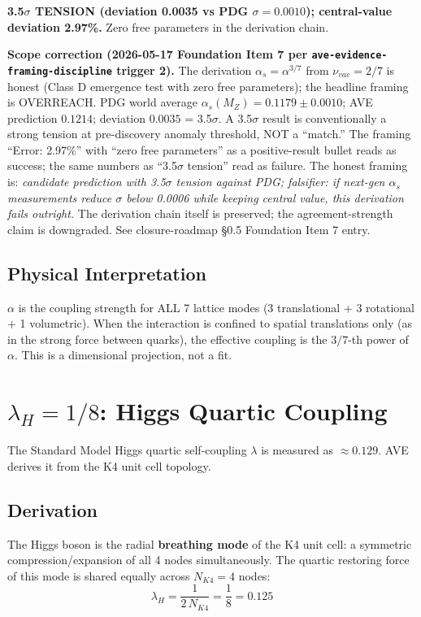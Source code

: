 \textbf{3.5$\sigma$ TENSION (deviation 0.0035 vs PDG $\sigma = 0.0010$); central-value deviation 2.97\%.}  Zero free parameters in the derivation chain.

\textbf{Scope correction (2026-05-17 Foundation Item 7 per \texttt{ave-evidence-framing-discipline} trigger 2).} The derivation $\alpha_s = \alpha^{3/7}$ from $\nu_{vac} = 2/7$ is honest (Class D emergence test with zero free parameters); the headline framing is OVERREACH. PDG world average $\alpha_s(M_Z) = 0.1179 \pm 0.0010$; AVE prediction $0.1214$; deviation $0.0035$ = 3.5$\sigma$. A 3.5$\sigma$ result is conventionally a strong tension at pre-discovery anomaly threshold, NOT a ``match.'' The framing ``Error: 2.97\%'' with ``zero free parameters'' as a positive-result bullet reads as success; the same numbers as ``3.5$\sigma$ tension'' read as failure. The honest framing is: \textit{candidate prediction with 3.5$\sigma$ tension against PDG; falsifier: if next-gen $\alpha_s$ measurements reduce $\sigma$ below 0.0006 while keeping central value, this derivation fails outright.} The derivation chain itself is preserved; the agreement-strength claim is downgraded. See closure-roadmap \S0.5 Foundation Item 7 entry.

\subsection{Physical Interpretation}

$\alpha$ is the coupling strength for ALL 7 lattice modes (3
translational + 3 rotational + 1 volumetric).  When the
interaction is confined to spatial translations only (as in the
strong force between quarks), the effective coupling is the
$3/7$-th power of $\alpha$.  This is a dimensional projection,
not a fit.


\section{$\lambda_H = 1/8$: Higgs Quartic Coupling}
\label{sec:lambda_higgs_derivation}

The Standard Model Higgs quartic self-coupling $\lambda$ is
measured as $\approx 0.129$.  AVE derives it from the K4 unit
cell topology.

\subsection{Derivation}

The Higgs boson is the radial \textbf{breathing mode} of the
K4 unit cell: a symmetric compression/expansion of all 4
nodes simultaneously.  The quartic restoring force of this
mode is shared equally across $N_{K4} = 4$ nodes:
\begin{equation}
    \boxed{\lambda_H = \frac{1}{2\,N_{K4}} = \frac{1}{8} = 0.125}
\end{equation}

